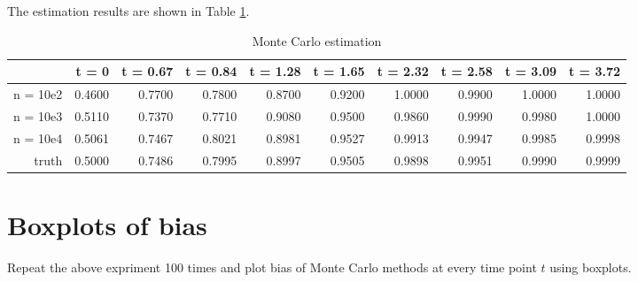 \documentclass[]{book}
\begin{document}
The estimation results are shown in Table \ref{MC result}.

\begin{table}[ht]
\centering
\begin{tabular}{rrrrrrrrrr}
  \hline
 & t = 0 & t = 0.67 & t = 0.84 & t = 1.28 & t = 1.65 & t = 2.32 & t = 2.58 & t = 3.09 & t = 3.72 \\ 
  \hline
n = 10e2 & 0.4600 & 0.7700 & 0.7800 & 0.8700 & 0.9200 & 1.0000 & 0.9900 & 1.0000 & 1.0000 \\ 
  n = 10e3 & 0.5110 & 0.7370 & 0.7710 & 0.9080 & 0.9500 & 0.9860 & 0.9990 & 0.9980 & 1.0000 \\ 
  n = 10e4 & 0.5061 & 0.7467 & 0.8021 & 0.8981 & 0.9527 & 0.9913 & 0.9947 & 0.9985 & 0.9998 \\ 
  truth & 0.5000 & 0.7486 & 0.7995 & 0.8997 & 0.9505 & 0.9898 & 0.9951 & 0.9990 & 0.9999 \\ 
   \hline
\end{tabular}
\caption{Monte Carlo estimation} 
\label{MC result}
\end{table}

\hypertarget{boxplots-of-bias}{%
\section{Boxplots of bias}\label{boxplots-of-bias}}

Repeat the above expriment 100 times and plot bias of Monte Carlo
methods at every time point \(t\) using boxplots.
\end{document}
